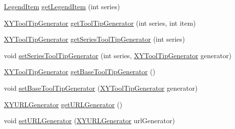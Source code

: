 \begin{DoxyCompactItemize}
\item 
\mbox{\hyperlink{classorg_1_1jfree_1_1chart_1_1_legend_item}{Legend\+Item}} \mbox{\hyperlink{classorg_1_1jfree_1_1chart_1_1renderer_1_1_default_polar_item_renderer_ad8ab0846350353938551d224b76c16fb}{get\+Legend\+Item}} (int series)
\item 
\mbox{\hyperlink{interfaceorg_1_1jfree_1_1chart_1_1labels_1_1_x_y_tool_tip_generator}{X\+Y\+Tool\+Tip\+Generator}} \mbox{\hyperlink{classorg_1_1jfree_1_1chart_1_1renderer_1_1_default_polar_item_renderer_a8cb1713bde0d1ef338294ee530885743}{get\+Tool\+Tip\+Generator}} (int series, int item)
\item 
\mbox{\hyperlink{interfaceorg_1_1jfree_1_1chart_1_1labels_1_1_x_y_tool_tip_generator}{X\+Y\+Tool\+Tip\+Generator}} \mbox{\hyperlink{classorg_1_1jfree_1_1chart_1_1renderer_1_1_default_polar_item_renderer_a359b2063f711745b5728ee139243b678}{get\+Series\+Tool\+Tip\+Generator}} (int series)
\item 
void \mbox{\hyperlink{classorg_1_1jfree_1_1chart_1_1renderer_1_1_default_polar_item_renderer_afd59a9fcaf9f825b6c86f04a29e9204d}{set\+Series\+Tool\+Tip\+Generator}} (int series, \mbox{\hyperlink{interfaceorg_1_1jfree_1_1chart_1_1labels_1_1_x_y_tool_tip_generator}{X\+Y\+Tool\+Tip\+Generator}} generator)
\item 
\mbox{\hyperlink{interfaceorg_1_1jfree_1_1chart_1_1labels_1_1_x_y_tool_tip_generator}{X\+Y\+Tool\+Tip\+Generator}} \mbox{\hyperlink{classorg_1_1jfree_1_1chart_1_1renderer_1_1_default_polar_item_renderer_a79cb58010b42feef92a7def54ad727ba}{get\+Base\+Tool\+Tip\+Generator}} ()
\item 
void \mbox{\hyperlink{classorg_1_1jfree_1_1chart_1_1renderer_1_1_default_polar_item_renderer_a57bdfb049e0c886624471fe2167fba2e}{set\+Base\+Tool\+Tip\+Generator}} (\mbox{\hyperlink{interfaceorg_1_1jfree_1_1chart_1_1labels_1_1_x_y_tool_tip_generator}{X\+Y\+Tool\+Tip\+Generator}} generator)
\item 
\mbox{\hyperlink{interfaceorg_1_1jfree_1_1chart_1_1urls_1_1_x_y_u_r_l_generator}{X\+Y\+U\+R\+L\+Generator}} \mbox{\hyperlink{classorg_1_1jfree_1_1chart_1_1renderer_1_1_default_polar_item_renderer_a4bb8861bfb9aec6a0e62a26e285f09fe}{get\+U\+R\+L\+Generator}} ()
\item 
void \mbox{\hyperlink{classorg_1_1jfree_1_1chart_1_1renderer_1_1_default_polar_item_renderer_a9a49fc33df2e4f9e3050dcbff3a03ead}{set\+U\+R\+L\+Generator}} (\mbox{\hyperlink{interfaceorg_1_1jfree_1_1chart_1_1urls_1_1_x_y_u_r_l_generator}{X\+Y\+U\+R\+L\+Generator}} url\+Generator)
\item 

\end{DoxyCompactItemize}
